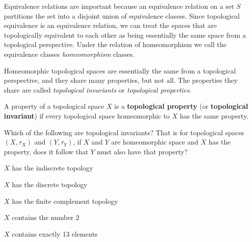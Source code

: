 Equivalence relations are important because an equivalence relation on a set $S$ partitions the set into a disjoint union of equivalence classes. Since topological equivalence is an equivalence relation, we can treat the spaces that are topologically equivalent to each other as being essentially the same space from a topological perspective. Under the relation of homeomorphism we call the equivalence classes \emph{homeomorphism} classes. 


\label{sec_top_invar}
Homeomorphic topological spaces are essentially the same from a topological perspective, and they share many properties, but not all. The properties they share are called \textit{topological invariants} or \emph{topological properties}.

\begin{definition} A property of a topological space $X$ is a \textbf{topological property} (or \textbf{topological invariant}) if every topological space homeomorphic to $X$ has the same property. 
\end{definition}

\begin{activity} Which of the following are topological invariants? That is for topological spaces $(X, \tau_X)$ and $(Y, \tau_Y)$, if $X$ and $Y$ are homeomorphic space and $X$ has the property, does it follow that $Y$ must also have that property?
\ba
\item $X$ has the indiscrete topology
\item $X$ has the discrete topology
\item $X$ has the finite complement topology
\item $X$ contains the number 2
\item $X$ contains exactly 13 elements
\ea
\end{activity}


